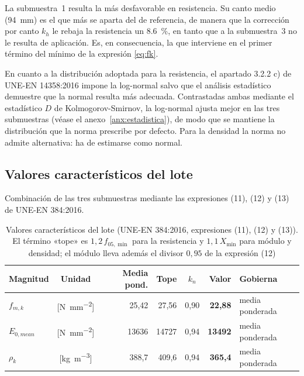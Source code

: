 \documentclass[11pt,a4paper]{article}
\begin{document}
\noindent La submuestra~1 resulta la más desfavorable en resistencia. Su canto medio
(\SI{94}{\milli\meter}) es el que más se aparta del de referencia, de manera que la
corrección por canto $k_{h}$ le rebaja la resistencia un \SI{8,6}{\percent}, en tanto
que a la submuestra~3 no le resulta de aplicación. Es, en consecuencia, la que
interviene en el primer término del mínimo de la expresión \eqref{eq:fk}.

\medskip
\noindent En cuanto a la distribución adoptada para la resistencia, el apartado
3.2.2 c) de UNE-EN 14358:2016 impone la log-normal salvo que el análisis estadístico
demuestre que la normal resulta más adecuada. Contrastadas ambas mediante el
estadístico $D$ de Kolmogorov-Smirnov, la log-normal ajusta mejor en las tres
submuestras (véase el anexo~\ref{anx:estadistica}), de modo que se mantiene la
distribución que la norma prescribe por defecto. Para la densidad la norma no admite
alternativa: ha de estimarse como normal.

\subsection{Valores característicos del lote}

Combinación de las tres submuestras mediante las expresiones (11), (12) y (13) de
UNE-EN 384:2016.

\begin{table}[H]
\centering
\caption[Valores característicos del lote (UNE-EN 384:2016, expresiones (11), (12) y (13))]{Valores característicos del lote (UNE-EN 384:2016, expresiones (11), (12) y (13)). El término «tope» es $1{,}2\,f_{05,\min}$ para la resistencia y $1{,}1\,X_{\min}$ para módulo y densidad; el módulo lleva además el divisor $0{,}95$ de la expresión (12)}
\begin{tabular}{l c r r c r l}
\toprule
\textbf{Magnitud} & \textbf{Unidad} & \textbf{Media pond.} & \textbf{Tope} & \textbf{$k_{n}$} & \textbf{Valor} & \textbf{Gobierna} \\
\midrule
$f_{m,k}$ & [\si{\newton\per\square\milli\meter}] & 25,42 & 27,56 & 0,90 & \textbf{22,88} & media ponderada \\
$E_{0,mean}$ & [\si{\newton\per\square\milli\meter}] & 13636 & 14727 & 0,94 & \textbf{13492} & media ponderada \\
$\rho_{k}$ & [\si{\kilo\gram\per\cubic\meter}] & 388,7 & 409,6 & 0,94 & \textbf{365,4} & media ponderada \\
\bottomrule
\end{tabular}
\end{table}
\end{document}
